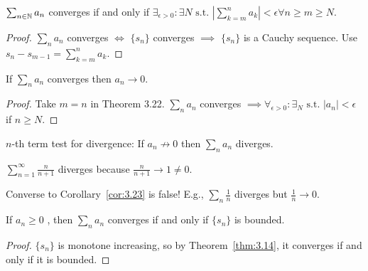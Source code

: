 \begin{theorem}
	$\sum_{n \in \mathbb{N}}{a_{n}}$ converges if and only if $\exists_{\epsilon >0}: \exists N \text{ s.t. } |\sum_{k=m}^{n}{a_{k}}| <\epsilon \forall{n\ge m\ge  N}$.
	\begin{proof}
		$\sum_{n}{a_{n}}$ converges $\Leftrightarrow $ $\{ {s}_{n}\}$ converges $\implies  $ $\{ {s}_{n}\}$ is a Cauchy sequence. Use $s_{n}-s_{m-1}=\sum_{k=m}^{n}{a_k}$.
	\end{proof}
\end{theorem}
\begin{corollary}
	\label{cor:3.23}
	If $\sum_{n}{a_{n}}$ converges then $a_{n}\to 0$.
	\begin{proof}
		Take $m=n$ in Theorem 3.22. $\sum_{n}{a_{n}}$ converges $\implies \forall_{\epsilon > 0}: \exists_{N} \text{ s.t. } |a_{n}| <\epsilon $ if $n\ge N$.
	\end{proof}
	\begin{remark}
		$n$-th term test for divergence: If $a_{n}\not\to 0$ then $\sum_n{a_{n}}$ diverges.
		\begin{example}
			$\sum_{n=1}^{\infty }{\frac{n}{n+1}}$ diverges because $\frac{n}{n+1}\to 1\neq 0$.
		\end{example}
		Converse to Corollary~\ref{cor:3.23} is false! E.g., $\sum_{n}{\frac{1}{n}}$ diverges but $\frac{1}{n}\to 0$.
	\end{remark}
\end{corollary}

\begin{theorem}
	\label{thm:3.24}
	If $a_{n}\ge 0$ , then $\sum_{n}{a_{n}}$ converges if and only if $\{ {s}_{n}\}$ is bounded.
	\begin{proof}
		$\{ {s}_{n}\}$ is monotone increasing, so by Theorem~\ref{thm:3.14}, it converges if and only if it is bounded.
	\end{proof}
\end{theorem}

